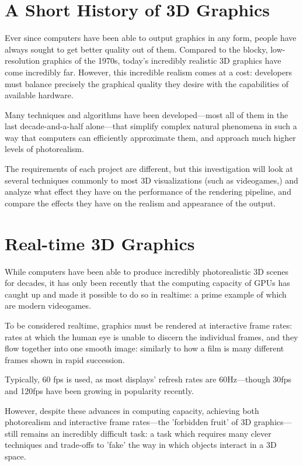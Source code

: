 \documentclass[11pt, oneside]{report}
\begin{document}
\section{A Short History of 3D Graphics}
Ever since computers have been able to output graphics in any form, people have always sought to get better quality out of them. Compared to the blocky, low-resolution graphics of the 1970s, today’s incredibly realistic 3D graphics have come incredibly far. However, this incredible realism comes at a cost: developers must balance precisely the graphical quality they desire with the capabilities of available hardware.

Many techniques and algorithms have been developed—most all of them in the last decade-and-a-half alone—that simplify complex natural phenomena in such a way that computers can efficiently approximate them, and approach much higher levels of photorealism.

The requirements of each project are different, but this investigation will look at several techniques commonly to most 3D visualizations (such as videogames,) and analyze what effect they have on the performance of the rendering pipeline, and compare the effects they have on the realism and appearance of the output.

\section{Real-time 3D Graphics}
While computers have been able to produce incredibly photorealistic 3D scenes for decades, it has only been recently that the computing capacity of \glspl{GPU} has caught up and made it possible to do so in realtime: a prime example of which are modern videogames.

To be considered realtime, graphics must be rendered at interactive \glspl{frame rate}: rates at which the human eye is unable to discern the individual frames, and they flow together into one smooth image: similarly to how a film is many different frames shown in rapid succession.

Typically, 60 \gls{fps} is used, as most displays' \glspl{refresh rate} are 60Hz---though 30\gls{fps} and 120\gls{fps} have been growing in popularity recently.

However, despite these advances in computing capacity, achieving both photorealism and interactive \glspl{frame rate}---the 'forbidden fruit' of 3D graphics---still remains an incredibly difficult task: a task which requires many clever techniques and trade-offs to 'fake' the way in which objects interact in a 3D space.
\end{document}
